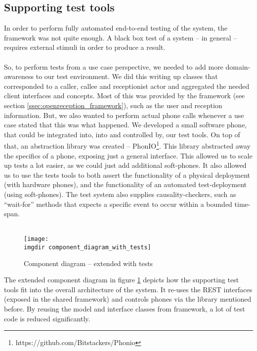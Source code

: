 \subsection{Supporting test tools}
\label{ssec:supporting-test-tools}
In order to perform fully automated end-to-end testing of the system, the framework was not quite enough. A black box test of a system -- in general -- requires external stimuli in order to produce a result.\\\\
So, to perform tests from a use case perspective, we needed to add more domain-awareness to our test environment. We did this writing up classes that corresponded to a caller, callee and receptionist actor and aggregated the needed client interfaces and concepts. Most of this was provided by the framework (see section \ref{ssec:openreception_framework}), such as the user and reception information. But, we also wanted to perform actual phone calls whenever a use case stated that this was what happened. We developed a small software phone, that could be integrated into, into and controlled by, our test tools. On top of that, an abstraction library was created -- PhonIO\footnote{https://github.com/Bitstackers/Phonio}. This library abstracted away the specifics of a phone, exposing just a general interface. This allowed us to scale up tests a lot easier, as we could just add additional soft-phones. It also allowed us to use the tests tools to both assert the functionality of a physical deployment (with hardware phones), and the functionality of an automated test-deployment (using soft-phones). The test system also supplies causality-checkers, such as ``wait-for'' methods that expects a specific event to occur within a bounded time-span.\\\\
\begin{figure}[!htbp]
\centering
\texttt{[image: \\imgdir component\_diagram\_with\_tests]}
\caption{Component diagram -- extended with tests}
\label{fig:component_diagram_with_tests}
\end{figure}The extended component diagram in figure \ref{fig:component_diagram_with_tests} depicts how the supporting test tools fit into the overall architecture of the system. It re-uses the REST interfaces (exposed in the shared framework) and controls phones via the library mentioned before. By reusing the model and interface classes from framework, a lot of test code is reduced significantly.
